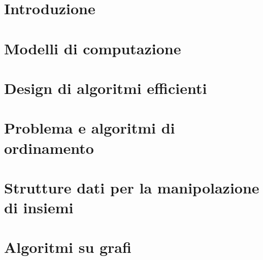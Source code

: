 \documentclass[12pt]{article}
\begin{document}


\tableofcontents
\restoregeometry

\section{Introduzione}


\section{Modelli di computazione}


\section{Design di algoritmi efficienti}


\section{Problema e algoritmi di ordinamento}


\section{Strutture dati per la manipolazione di insiemi}


\section{Algoritmi su grafi}

\end{document}
